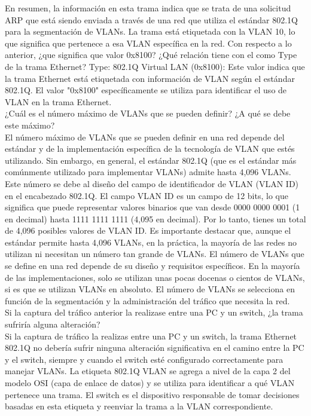 \documentclass[a4paper]{article}
\begin{document}
\begin{enumerate}
	En resumen, la información en esta trama indica que se trata de una solicitud ARP que está siendo enviada a través de una red que utiliza el estándar 802.1Q para la segmentación de VLANs. La trama está etiquetada con la VLAN 10, lo que significa que pertenece a esa VLAN específica en la red.
	Con respecto a lo anterior, ¿que significa que valor 0x8100? ¿Qué relación tiene con el como Type de la trama Ethernet?
	Type: 802.1Q Virtual LAN (0x8100): Este valor indica que la trama Ethernet está etiquetada con información de VLAN según el estándar 802.1Q. El valor "0x8100" específicamente se utiliza para identificar el uso de VLAN en la trama Ethernet.
  \\ ¿Cuál es el número máximo de VLANs que se pueden definir? ¿A qué se debe este máximo?
\\
El número máximo de VLANs que se pueden definir en una red depende del estándar y de la implementación específica de la tecnología de VLAN que estés utilizando. Sin embargo, en general, el estándar 802.1Q (que es el estándar más comúnmente utilizado para implementar VLANs) admite hasta 4,096 VLANs.
Este número se debe al diseño del campo de identificador de VLAN (VLAN ID) en el encabezado 802.1Q. El campo VLAN ID es un campo de 12 bits, lo que significa que puede representar valores binarios que van desde 0000 0000 0001 (1 en decimal) hasta 1111 1111 1111 (4,095 en decimal). Por lo tanto, tienes un total de 4,096 posibles valores de VLAN ID.
Es importante destacar que, aunque el estándar permite hasta 4,096 VLANs, en la práctica, la mayoría de las redes no utilizan ni necesitan un número tan grande de VLANs. El número de VLANs que se define en una red depende de su diseño y requisitos específicos. En la mayoría de las implementaciones, solo se utilizan unas pocas docenas o cientos de VLANs, si es que se utilizan VLANs en absoluto. El número de VLANs se selecciona en función de la segmentación y la administración del tráfico que necesita la red.
\\ Si la captura del tráfico anterior la realizase entre una
	PC y un switch, ¿la trama sufriría alguna alteración?
\\
Si la captura de tráfico la realizas entre una PC y un switch, la trama Ethernet 802.1Q no debería sufrir ninguna alteración significativa en el camino entre la PC y el switch, siempre y cuando el switch esté configurado correctamente para manejar VLANs.
La etiqueta 802.1Q VLAN se agrega a nivel de la capa 2 del modelo OSI (capa de enlace de datos) y se utiliza para identificar a qué VLAN pertenece una trama. El switch es el dispositivo responsable de tomar decisiones basadas en esta etiqueta y reenviar la trama a la VLAN correspondiente.

\end{enumerate}
\end{document}
